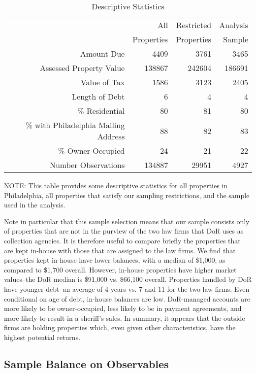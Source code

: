 \documentclass[12pt,titlepage]{article}
\begin{document}
\begin{table}[htb]
\begin{center}
\caption{Descriptive Statistics}\label{table:ds}
\begin{tabular}{|r|r|r|r|}
  \hline
   & All  & Restricted & Analysis  \\ 
 & Properties & Properties &  Sample \\ 
  \hline
Amount Due & 4409 & 3761 & 3465 \\ 
  Assessed Property Value & 138867 & 242604 & 186691 \\ 
  Value of Tax & 1586 & 3123 & 2405 \\ 
  Length of Debt & 6 & 4 & 4 \\ 
  \% Residential & 80 & 81 & 80 \\ 
  \% with Philadelphia Mailing Address & 88 & 82 & 83 \\ 
  \% Owner-Occupied & 24 & 21 & 22 \\ 
  Number Observations & 134887 & 29951 & 4927 \\ 
   \hline
\end{tabular}
\end{center}
NOTE: This table provides some descriptive statistics for all
properties in Philadelphia, all properties that satisfy our sampling
restrictions, and the sample used in the analysis.
\end{table}

Note in particular that this sample selection means that our sample
consists only of properties that are not in the purview of the two law
firms that DoR uses as collection agencies. It is therefore useful to
compare briefly the properties that are kept in-house with those that
are assigned to the law firms. We find that properties kept in-house
have lower balances, with a median of \$1,000, as compared to \$1,700
overall. However, in-house properties have higher market values--the
DoR median is \$91,000 vs. \$66,100 overall. Properties handled by DoR
have younger debt--an average of 4 years vs. 7 and 11 for the two law
firms.  Even conditional on age of debt, in-house balances are low.
DoR-managed accounts are more likely to be owner-occupied, less likely
to be in payment agreements, and more likely to result in a sheriff's
sales. In summary, it appears that the outside firms are holding
properties which, even given other characteristics, have the highest
potential returns.

\subsection{Sample Balance on Observables}
\end{document}
